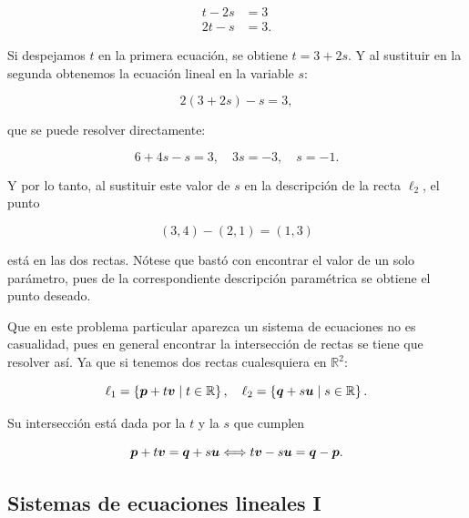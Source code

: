 \documentclass{article}
\theoremstyle{definicion}
\theoremstyle{definition}             %
\theoremstyle{definition}             %
\theoremstyle{definition}
\theoremstyle{definition}
\theoremstyle{observacion}
\theoremstyle{definition}
\theoremstyle{plain}
\theoremstyle{definition}
\theoremstyle{afirmacion}
\theoremstyle{notation}
\theoremstyle{definition}
\begin{document}
        \begin{align*}
            t - 2s &= 3 \\
            2t - s &= 3.
        \end{align*}

        Si despejamos \(t\) en la primera ecuación, se obtiene \(t = 3 + 2s\). Y al sustituir en la segunda obtenemos la ecuación lineal en la variable \(s\):

        \begin{equation*}
            2(3 + 2s) - s = 3,
        \end{equation*}

        que se puede resolver directamente:

        \begin{equation*}
            6 + 4s - s = 3, \quad 3s = -3, \quad s = -1.
        \end{equation*}

        Y por lo tanto, al sustituir este valor de \(s\) en la descripción de la recta \(\ell_{2}\), el punto

        \begin{equation*}
            (3, 4) - (2, 1) = (1, 3)
        \end{equation*}

        está en las dos rectas. Nótese que bastó con encontrar el valor de un solo parámetro, pues de la correspondiente descripción paramétrica se obtiene el punto deseado.

        Que en este problema particular aparezca un sistema de ecuaciones no es casualidad, pues en general encontrar la intersección de rectas se tiene que resolver así. Ya que si tenemos dos rectas cualesquiera en \(\mathbb{R}^{2}\):

        \begin{equation*}
            \ell_{1} = \left\lbrace\vb*{p} + t\vb*{v} \mid t \in \mathbb{R}\right\rbrace, \quad \ell_{2} = \left\lbrace\vb*{q} + s\vb*{u} \mid s \in \mathbb{R}\right\rbrace.
        \end{equation*}

        Su intersección	 está dada por la \(t\) y la \(s\) que cumplen

        \begin{equation*}
            \vb*{p} + t\vb*{v} = \vb*{q} + s\vb*{u} \Longleftrightarrow t\vb*{v} - s\vb*{u} = \vb*{q} - \vb*{p}.
        \end{equation*}

        \subsection{Sistemas de ecuaciones lineales I}
\end{document}

